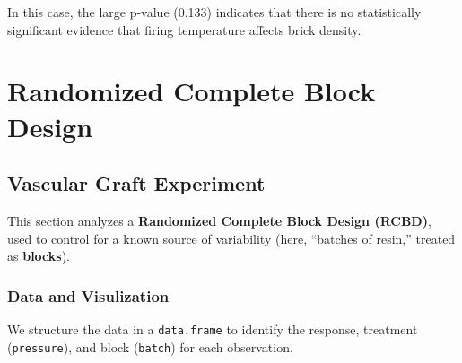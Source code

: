 \documentclass[
  letterpaper,
  DIV=11,
  numbers=noendperiod]{scrreprt}
\begin{document}
In this case, the large p-value (0.133) indicates that there is no
statistically significant evidence that firing temperature affects brick
density.

\section{Randomized Complete Block
Design}\label{randomized-complete-block-design-1}

\subsection{Vascular Graft Experiment}\label{vascular-graft-experiment}

This section analyzes a \textbf{Randomized Complete Block Design
(RCBD)}, used to control for a known source of variability (here,
``batches of resin,'' treated as \textbf{blocks}).

\subsubsection{Data and Visulization}\label{data-and-visulization}

We structure the data in a \texttt{data.frame} to identify the response,
treatment (\texttt{pressure}), and block (\texttt{batch}) for each
observation.
\end{document}
